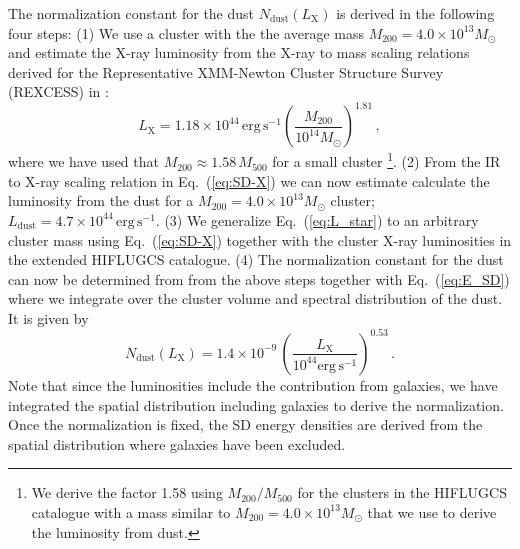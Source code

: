 \documentclass[10pt,aps,pra,reprint,amsmath,amsfonts,amssymb,showpacs]{revtex4-1}
\newcommand{\rmn}{\mathrm}
\newcommand{\msun}{M_\odot}
\newcommand{\dust}{\rmn{dust}}
\newcommand{\lx}{L_\rmn{X}}
\newcommand{\mvir}{M_{200}}
\begin{document}
The normalization constant for the dust $N_\dust(\lx)$ is derived in the
following four steps: (1) We use a cluster with the the average mass
$\mvir=4.0\times10^{13}\msun$ and estimate the X-ray luminosity from
the X-ray to mass scaling relations derived for the Representative
XMM-Newton Cluster Structure Survey (REXCESS) in
\cite{2009A&A...498..361P}:
\begin{equation}
\lx=1.18\times 10^{44}\,\rmn{erg\,s}^{-1}
\left(\frac{M_{200}}{10^{14}\msun}\right)^{1.81}\,,
\end{equation}
where we have used that $M_\rmn{200} \approx 1.58\,M_\rmn{500}$ for a
small cluster \footnote{We derive the factor 1.58 using
  $M_\rmn{200}/M_\rmn{500}$ for the clusters in the HIFLUGCS catalogue
  with a mass similar to $\mvir=4.0\times10^{13}\msun$ that we use to
  derive the luminosity from dust.}. (2) From the IR to X-ray scaling
relation in Eq.~(\ref{eq:SD-X}) we can now estimate calculate the
luminosity from the dust for a $\mvir=4.0\times10^{13}\msun$ cluster;
$L_\dust=4.7\times10^{44}\,\rmn{erg\,s}^{-1}$. (3) We generalize
Eq.~(\ref{eq:L_star}) to an arbitrary cluster mass using
Eq.~(\ref{eq:SD-X}) together with the cluster X-ray luminosities in
the extended HIFLUGCS catalogue. (4) The normalization constant for
the dust can now be determined from from the above steps together with
Eq.~(\ref{eq:E_SD}) where we integrate over the cluster volume and
spectral distribution of the dust. It is given by
\begin{equation}
 N_\dust(\lx) = 1.4\times10^{-9}\,
\left(\frac{\lx}{10^{44}\rmn{erg\,s}^{-1}}\right)^{0.53}\,.
\label{eq:N_stars}
\end{equation}
Note that since the luminosities include the contribution from
galaxies, we have integrated the spatial distribution including
galaxies to derive the normalization. Once the normalization is fixed,
the SD energy densities are derived from the spatial distribution
where galaxies have been excluded.
\end{document}
